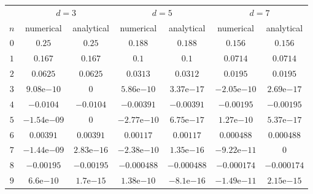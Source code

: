 \begin{tabular}{@{}ccccccc@{}}
\toprule
& 
\multicolumn{2}{c}{$d = 3$} &
\multicolumn{2}{c}{$d = 5$} &
\multicolumn{2}{c}{$d = 7$} \\
\cmidrule(lr){2-3} \cmidrule(lr){4-5} \cmidrule(lr){6-7}
$n$ &
numerical &
analytical &
numerical &
analytical &
numerical &
analytical \\
\midrule
$0$ &
$0.25$ &
$0.25$ &
$0.188$ &
$0.188$ &
$0.156$ &
$0.156$ \\
$1$ &
$0.167$ &
$0.167$ &
$0.1$ &
$0.1$ &
$0.0714$ &
$0.0714$ \\
$2$ &
$0.0625$ &
$0.0625$ &
$0.0313$ &
$0.0312$ &
$0.0195$ &
$0.0195$ \\
$3$ &
$9.08\textrm{e}{-10}$ &
$0$ &
$5.86\textrm{e}{-10}$ &
$3.37\textrm{e}{-17}$ &
$-2.05\textrm{e}{-10}$ &
$2.69\textrm{e}{-17}$ \\
$4$ &
$-0.0104$ &
$-0.0104$ &
$-0.00391$ &
$-0.00391$ &
$-0.00195$ &
$-0.00195$ \\
$5$ &
$-1.54\textrm{e}{-09}$ &
$0$ &
$-2.77\textrm{e}{-10}$ &
$6.75\textrm{e}{-17}$ &
$1.27\textrm{e}{-10}$ &
$5.37\textrm{e}{-17}$ \\
$6$ &
$0.00391$ &
$0.00391$ &
$0.00117$ &
$0.00117$ &
$0.000488$ &
$0.000488$ \\
$7$ &
$-1.44\textrm{e}{-09}$ &
$2.83\textrm{e}{-16}$ &
$-2.38\textrm{e}{-10}$ &
$1.35\textrm{e}{-16}$ &
$-9.22\textrm{e}{-11}$ &
$0$ \\
$8$ &
$-0.00195$ &
$-0.00195$ &
$-0.000488$ &
$-0.000488$ &
$-0.000174$ &
$-0.000174$ \\
$9$ &
$6.6\textrm{e}{-10}$ &
$1.7\textrm{e}{-15}$ &
$1.38\textrm{e}{-10}$ &
$-8.1\textrm{e}{-16}$ &
$-1.49\textrm{e}{-11}$ &
$2.15\textrm{e}{-15}$ \\
\bottomrule
\end{tabular}